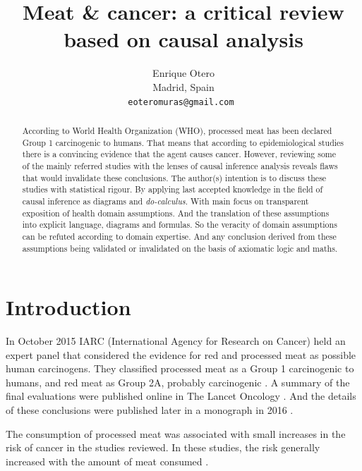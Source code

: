 \documentclass{article}
\title{Meat \& cancer: a critical review based on causal analysis %
}
\author{
 Enrique Otero \\
  Madrid, Spain\\
  \texttt{eoteromuras@gmail.com%
  } \\
}
\begin{document}
\maketitle

\begin{abstract}
According to World Health Organization (WHO), processed meat has been declared Group 1 carcinogenic to humans. That means that according to epidemiological studies there is a convincing evidence that the agent causes cancer. However, reviewing some of the mainly referred studies with the lenses of causal inference analysis reveals flaws that would invalidate these conclusions. The author(s) intention is to discuss these studies with statistical rigour. By applying last accepted knowledge in the field of causal inference as diagrams and \textit{do-calculus}. With main focus on transparent exposition of health domain assumptions. And the translation of these assumptions into explicit language, diagrams and formulas. So the veracity of domain assumptions can be refuted according to domain expertise. And any conclusion derived from these assumptions being validated or invalidated on the basis of axiomatic logic and maths.

\end{abstract}




\section{Introduction}
 In October 2015 IARC (International Agency for Research on Cancer) held an expert panel that considered the evidence for red and processed meat as possible human carcinogens. They classified processed meat as a Group 1 carcinogenic to humans, and red meat as Group 2A, probably carcinogenic \cite{whoint}. A summary of the final evaluations were published online in The Lancet Oncology \cite{lancet}. And the details of these conclusions were published later in a monograph in 2016 \cite{monograph}.

The consumption of processed meat was associated with small increases in the risk of cancer in the studies reviewed. In these studies, the risk generally increased with the amount of meat consumed \cite{whoint}.
\end{document}
